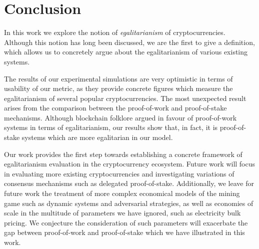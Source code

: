 \section{Conclusion}\label{sec:conclusion}

In this work we explore the notion of \emph{egalitarianism} of
cryptocurrencies. Although this notion has long been discussed, we are the first
to give a definition, which allows us to concretely argue about the
egalitarianism of various existing systems.

The results of our experimental simulations are very optimistic in
terms of usability of our metric, as they provide concrete figures
which measure the egalitarianism of several popular cryptocurrencies.
The most unexpected result arises from the comparison between the proof-of-work
and proof-of-stake mechanisms. Although blockchain folklore argued in favour of
proof-of-work systems in terms of egalitarianism,
our results show that, in fact, it is proof-of-stake systems which are more
egalitarian in our model.

Our work provides the first step towards establishing a concrete framework of
egalitarianism evaluation in the cryptocurrency ecosystem. Future work will
focus in evaluating more existing cryptocurrencies and
investigating variations of consensus mechanisms such as delegated
proof-of-stake. Additionally, we leave for future work the treatment of more
complex economical models
of the mining game such as dynamic systems and adversarial strategies, as well
as economies of scale in the multitude of parameters we have ignored, such as
electricity bulk pricing. We conjecture the consideration of such parameters
will exacerbate the gap between proof-of-work and proof-of-stake which we have
illustrated in this work.
